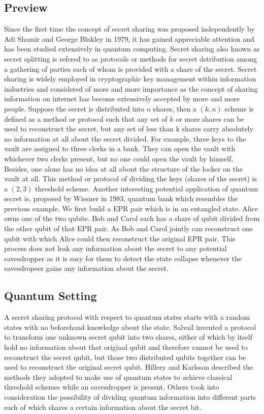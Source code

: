 \documentclass[12pt]{article}
\begin{document}
\subsection{Preview}
Since the first time the concept of secret sharing was proposed independently by Adi Shamir\cite{Shamir} and George Blakley\cite{Blakley} in 1979, it has gained appreciable attention and has been studied extensively in quantum computing.
	Secret sharing also known as secret splitting is refered to as protocols or methods for secret dstribution among a gathering of parties each of whom is provided with a share of the secret. 
	Secret sharing is widely employed in cryptographic key management within information industries and considered of more and more importance as the concept of sharing information on internet has become extensively accepted by more and more people.
	Suppose the secret is distributed into $n$ shares, then a $(k,n)$ scheme is defined as a method or protocol such that any set of $k$ or more shares can be used to reconstruct the secret, but any set of less than k shares carry absolutely no information at all about the secret divided. 
	For example, three keys to the vault are assigned to three clerks in a bank. 
	They can open the vault with whichever two clerks present, but no one could open the vault by himself. 
	Besides, one alone has no idea at all about the structure of the locker on the vault at all. 
	This method or protocol of dividing the keys (shares of the secret) is a $(2,3)$ threshold scheme.
	Another interesting potential application of quantum secret is, proposed by Wiesner\cite{Wiesner} in 1983, quantum bank which resembles the previous example.
	We first build a EPR pair which is in an entangled state. Alice owns one of the two qubits. Bob and Carol each has a share of qubit divided from the other qubit of that EPR pair. As Bob and Carol jointly can reconstruct one qubit with which Alice could then reconstruct the original EPR pair. This process does not leak any information about the secret to any potential eavesdropper as it is easy for them to detect the state collapse whenever the eavesdropeer gains any information about the secret.
	\\
\subsection{Quantum Setting}
    A secret sharing protocol with respect to quantum states starts with a random states with no beforehand knowledge about the state. 
	Salvail\cite{Salvail} invented a protocol to transform one unknown secret qubit into two shares, either of which by itself hold no information about that original qubit and therefore cannot be used to reconstruct the secret qubit, 
	but those two distributed qubits together can be used to reconstruct the original secret qubit.
	Hillery\cite{Hillery} and Karlsson\cite{Karlsson} described the methods they adopted to make use of quantum states to achieve classical threshold schemes while an eavesdropper is present. Others took into consideration the possibility of dividing quantum information into different parts each of which shares a certain information about the secret bit.
\end{document}
